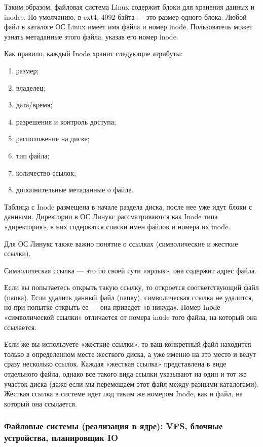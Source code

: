 Таким образом, файловая система Linux содержит блоки для хранения данных и inodes. По умолчанию, в ext4, 4092 байта — это размер одного блока. Любой файл в каталоге ОС Linux имеет имя файла и номер inode. Пользователь может узнать метаданные этого файла, указав его номер inode.

Как правило, каждый Inode хранит следующие атрибуты:
\begin{enumerate}
	\item размер;
	\item владелец;
	\item дата/время;
	\item разрешения и контроль доступа;
	\item расположение на диске;
	\item тип файла;
	\item количество ссылок;
	\item дополнительные метаданные о файле.
\end{enumerate}

Таблица с Inode размещена в начале раздела диска, после нее уже идут блоки с данными. Директории в ОС Линукс рассматриваются как Inode типа «директория», в них содержатся списки имен файлов и номера их inode.

Для ОС Линукс также важно понятие о ссылках (символические и жесткие ссылки).

Символическая ссылка — это по своей сути «ярлык», она содержит адрес файла.

Если вы попытаетесь открыть такую ссылку, то откроется соответствующий файл (папка). Если удалить данный файл (папку), символическая ссылка не удалится, но при попытке открыть ее — она приведет «в никуда». Номер Inоdе «символической ссылки» отличается от номера inоde того файла, на который она ссылается.

Если же вы используете «жесткие ссылки», то ваш конкретный файл находится только в определенном месте жесткого диска, а уже именно на это место и ведут сразу несколько ссылок. Каждая «жесткая ссылка» представлена в виде отдельного файла, однако все такого вида ссылки указывают на один и тот же участок диска (даже если мы перемещаем этот файл между разными каталогами). Жесткая ссылка в системе идет под таким же номером Inode, как и фaйл, на который она ссылается.


\subsubsection{Файловые системы (реализация в ядре): VFS, блочные устройства, планировщик IO}

